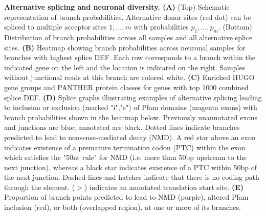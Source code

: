 \textbf{Alternative splicing and neuronal diversity. (A)} (Top) Schematic representation of branch probabilities. Alternative donor sites (red dot) can be spliced to multiple acceptor sites $1,\ldots, m$ with probabilities $p_{1},\ldots,p_{m}$. (Bottom) Distribution of branch probabilities across all samples and all alternative splice sites. \textbf{(B)} Heatmap showing branch probabilities across neuronal samples for branches with highest splice DEF. Each row corresponds to a branch within the indicated gene on the left and the location is indicated on the right. Samples without junctional reads at this branch are colored white. \textbf{(C)} Enriched HUGO gene groups and PANTHER protein classes for genes with top 1000 combined splice DEF. \textbf{(D)} Splice graphs illustrating examples of alternative splicing leading to inclusion or exclusion (marked "i","e") of Pfam domains (magenta exons) with branch probabilities shown in the heatmap below. Previously unannotated exons and junctions are blue; annotated are black. Dotted lines indicate branches predicted to lead to nonsense-mediated decay (NMD). A red star above an exon indicates existence of a premature termination codon (PTC) within the exon which satisfies the "50nt rule" for NMD \citep{Nagy_1998} (i.e. more than 50bp upstream to the next junction), whereas a black star indicates existence of a PTC within 50bp of the next junction. Dashed lines and hatches indicate that there is no coding path through the element. ($\gt$) indicates an annotated translation start site. \textbf{(E)} Proportion of branch points predicted to lead to NMD (purple), altered Pfam inclusion (red), or both (overlapped region), at one or more of its branches.
